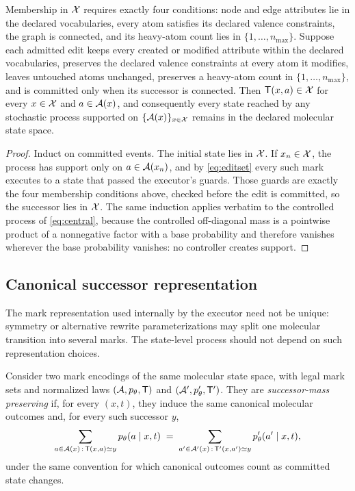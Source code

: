 \begin{proposition}
Membership in $\mathcal{X}$ requires exactly four conditions: node and edge attributes lie in the declared vocabularies, every atom satisfies its declared valence constraints, the graph is connected, and its heavy-atom count lies in $\{1,\dots,n_{\max}\}$. Suppose each admitted edit keeps every created or modified attribute within the declared vocabularies, preserves the declared valence constraints at every atom it modifies, leaves untouched atoms unchanged, preserves a heavy-atom count in $\{1,\dots,n_{\max}\}$, and is committed only when its successor is connected. Then $\mathsf{T}(x,a)\in\mathcal{X}$ for every $x\in\mathcal{X}$ and $a\in\mathcal{A}(x)$, and consequently every state reached by any stochastic process supported on $\{\mathcal{A}(x)\}_{x\in\mathcal{X}}$ remains in the declared molecular state space.
\end{proposition}

\begin{proof}
Induct on committed events. The initial state lies in $\mathcal{X}$. If $x_n\in\mathcal{X}$, the process has support only on $a\in\mathcal{A}(x_n)$, and by \eqref{eq:editset} every such mark executes to a state that passed the executor's guards. Those guards are exactly the four membership conditions above, checked before the edit is committed, so the successor lies in $\mathcal{X}$. The same induction applies verbatim to the controlled process of \eqref{eq:central}, because the controlled off-diagonal mass is a pointwise product of a nonnegative factor with a base probability and therefore vanishes wherever the base probability vanishes: no controller creates support.
\end{proof}

\subsection{Canonical successor representation}
\label{app:quotient}

The mark representation used internally by the executor need not be unique: symmetry or alternative rewrite parameterizations may split one molecular transition into several marks. The state-level process should not depend on such representation choices.

\begin{definition}
\label{def:reencoding}
Consider two mark encodings of the same molecular state space, with legal mark sets and normalized laws $(\mathcal{A},p_\theta,\mathsf{T})$ and $(\mathcal{A}',p'_\theta,\mathsf{T}')$. They are \emph{successor-mass preserving} if, for every $(x,t)$, they induce the same canonical molecular outcomes and, for every such successor $y$,
\[
\sum_{a\in\mathcal{A}(x)\,:\,\mathsf{T}(x,a)\simeq y} p_\theta(a\mid x,t)
\;=\;
\sum_{a'\in\mathcal{A}'(x)\,:\,\mathsf{T}'(x,a')\simeq y} p'_\theta(a'\mid x,t),
\]
under the same convention for which canonical outcomes count as committed state changes.
\end{definition}

